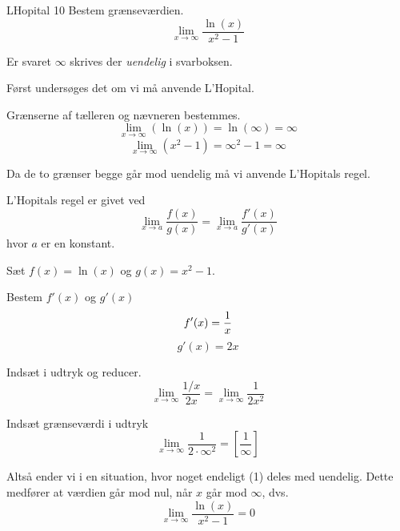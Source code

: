 \documentclass{article}
\begin{document}
\begin{exercise}{LHopital 10}
Bestem grænseværdien.
\[
\lim_{x \to \infty} \frac{\ln(x)}{x^2-1}
\] 

Er svaret $\infty$ skrives der \emph{uendelig} i svarboksen.


\hint
Først undersøges det om vi må anvende L'Hopital.

\hint
Grænserne af tælleren og nævneren bestemmes.
\[
\lim_{x \to \infty} (\ln(x)) = \ln(\infty) = \infty 
\]
\[
\lim_{x \to \infty} (x^2 - 1) = \infty^2 - 1 = \infty
\]

\hint
Da de to grænser begge går mod uendelig må vi  anvende L'Hopitals regel. 

\hint
L'Hopitals regel er givet ved
\[
\lim_{x \to a} \frac{f(x)}{g(x)} = \lim_{x \to a} \frac{f'(x)}{g'(x)} 
\]
hvor $a$  er en konstant.

\hint
Sæt $f(x) = \ln(x)$ og $g(x) = x^2-1$. 

\hint
Bestem $f'(x)$ og $g'(x)$
\[
f'(x) = \frac{1}{x} \\
\]
\[
g'(x) = 2x
\]

\hint
Indsæt i udtryk og reducer. 
\[
\lim_{x \to \infty} \frac{1/x}{2x} = \lim_{x \to \infty} \frac{1}{2x^2} 
\]

\hint
Indsæt grænseværdi i udtryk
\[
\lim_{x \to \infty} \frac{1}{2 \cdot \infty^2}  = \left[ \frac{1}{\infty}  \right] 
\]

\hint
Altså ender vi i en situation, hvor noget endeligt (1) deles med uendelig. Dette medfører at værdien går mod nul, når $x$ går mod $\infty$, dvs.
\[
\lim_{x \to \infty} \frac{\ln(x)}{x^2 - 1} = 0
\]


\end{exercise}
\end{document}
